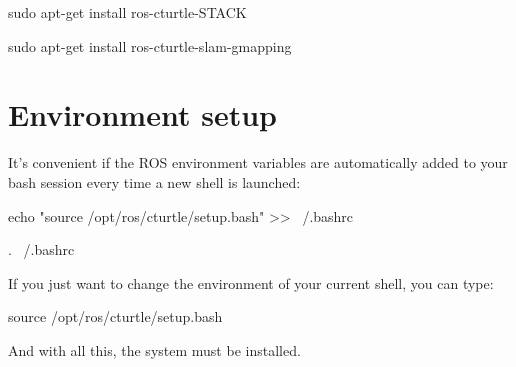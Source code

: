\hspace{4em}
sudo apt-get install ros-cturtle-STACK

\hspace{4em}
sudo apt-get install ros-cturtle-slam-gmapping


\section{Environment setup}

It's convenient if the ROS environment variables are automatically added to your bash session every time a new shell is launched:
\newline

\hspace{2em} echo "source /opt/ros/cturtle/setup.bash" >> ~/.bashrc

\hspace{2em} . ~/.bashrc
\newline

If you just want to change the environment of your current shell, you can type:
\newline

\hspace{2em} source /opt/ros/cturtle/setup.bash
\newline

And with all this, the system must be installed.


